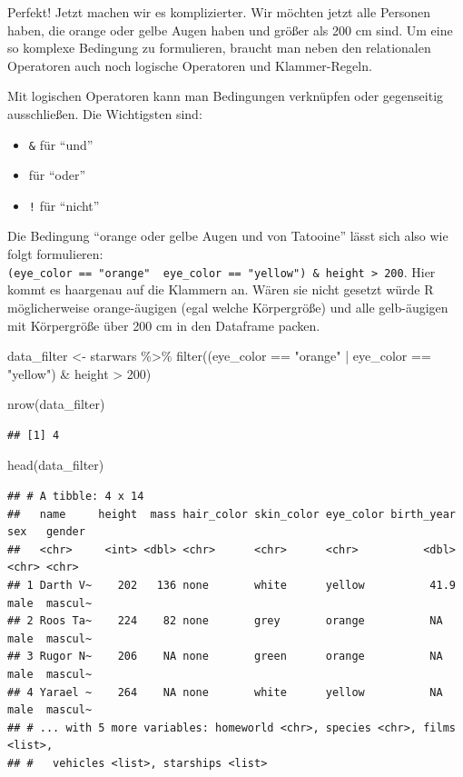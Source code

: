 \documentclass[
]{book}
\newenvironment{Shaded}{\begin{snugshade}}{\end{snugshade}}
\newcommand{\DecValTok}[1]{\textcolor[rgb]{0.00,0.00,0.81}{#1}}
\newcommand{\FunctionTok}[1]{\textcolor[rgb]{0.00,0.00,0.00}{#1}}
\newcommand{\NormalTok}[1]{#1}
\newcommand{\OtherTok}[1]{\textcolor[rgb]{0.56,0.35,0.01}{#1}}
\newcommand{\SpecialCharTok}[1]{\textcolor[rgb]{0.00,0.00,0.00}{#1}}
\newcommand{\StringTok}[1]{\textcolor[rgb]{0.31,0.60,0.02}{#1}}
\begin{document}
Perfekt! Jetzt machen wir es komplizierter. Wir möchten jetzt alle Personen haben, die orange oder gelbe Augen haben und größer als 200 cm sind. Um eine so komplexe Bedingung zu formulieren, braucht man neben den relationalen Operatoren auch noch logische Operatoren und Klammer-Regeln.

Mit logischen Operatoren kann man Bedingungen verknüpfen oder gegenseitig ausschließen. Die Wichtigsten sind:

\begin{itemize}
\item
  \texttt{\&} für ``und''
\item
  \texttt{\textbar{}} für ``oder''
\item
  \texttt{!} für ``nicht''
\end{itemize}

Die Bedingung ``orange oder gelbe Augen und von Tatooine'' lässt sich also wie folgt formulieren: \texttt{(eye\_color\ ==\ "orange"\ \textbar{}\ eye\_color\ ==\ "yellow")\ \&\ height\ \textgreater{}\ 200}. Hier kommt es haargenau auf die Klammern an. Wären sie nicht gesetzt würde R möglicherweise orange-äugigen (egal welche Körpergröße) und alle gelb-äugigen mit Körpergröße über 200 cm in den Dataframe packen.

\begin{Shaded}
\begin{Highlighting}[]
\NormalTok{data\_filter }\OtherTok{\textless{}{-}}\NormalTok{ starwars }\SpecialCharTok{\%\textgreater{}\%} 
  \FunctionTok{filter}\NormalTok{((eye\_color }\SpecialCharTok{==} \StringTok{"orange"} \SpecialCharTok{|}\NormalTok{ eye\_color }\SpecialCharTok{==} \StringTok{"yellow"}\NormalTok{) }\SpecialCharTok{\&}\NormalTok{ height }\SpecialCharTok{\textgreater{}} \DecValTok{200}\NormalTok{)}

\FunctionTok{nrow}\NormalTok{(data\_filter)}
\end{Highlighting}
\end{Shaded}

\begin{verbatim}
## [1] 4
\end{verbatim}

\begin{Shaded}
\begin{Highlighting}[]
\FunctionTok{head}\NormalTok{(data\_filter)}
\end{Highlighting}
\end{Shaded}

\begin{verbatim}
## # A tibble: 4 x 14
##   name     height  mass hair_color skin_color eye_color birth_year sex   gender 
##   <chr>     <int> <dbl> <chr>      <chr>      <chr>          <dbl> <chr> <chr>  
## 1 Darth V~    202   136 none       white      yellow          41.9 male  mascul~
## 2 Roos Ta~    224    82 none       grey       orange          NA   male  mascul~
## 3 Rugor N~    206    NA none       green      orange          NA   male  mascul~
## 4 Yarael ~    264    NA none       white      yellow          NA   male  mascul~
## # ... with 5 more variables: homeworld <chr>, species <chr>, films <list>,
## #   vehicles <list>, starships <list>
\end{verbatim}
\end{document}
